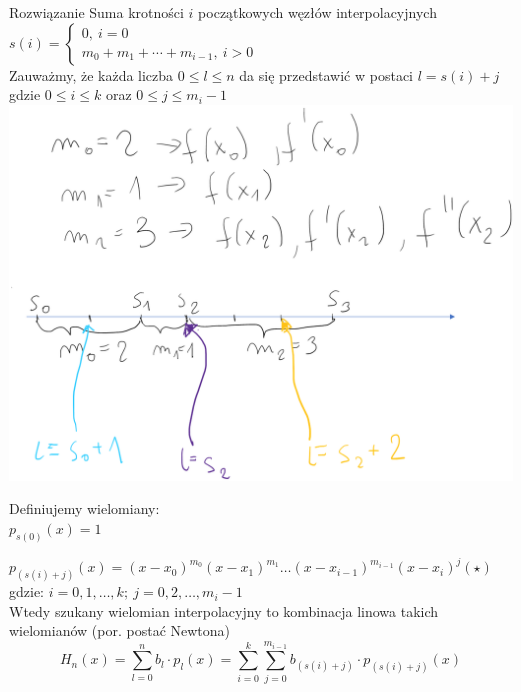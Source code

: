 \begin{frame}{Rozwiązanie}
Suma krotności $i$ początkowych węzłów interpolacyjnych
\vspace{2mm}
$s(i)=\left\{\begin{array}{l}
0,\ i=0\\
m_{0}+m_{1}+\cdots+m_{i-1},\ i>0
\end{array}\right.$
\vspace{2mm}\\

Zauważmy, że każda liczba 
$0\leq l\leq n$ da się przedstawić w postaci $l=s(i)+j$ gdzie $0 \leq i \leq k$ oraz $0 \leq j \leq m_{i}-1$\\
\includegraphics[scale=0.3]{img/3/hermit.png}
\end{frame}
\begin{frame}
\vspace{0.5cm}
Definiujemy wielomiany:\\
$p_{s(0)}(x)=1$

$p_{(s(i)+j)}(x)=(x-x_{0})^{m_{0}}(x-x_{1})^{m_{1}}\ldots(x-x_{i-1})^{m_{i-1}}(x-x_{i})^{j}(\star)$ \\
gdzie: $i=0, 1, \dots, k; \: j=0, 2, \dots , m_{i}-1$ \\
Wtedy szukany wielomian interpolacyjny to kombinacja linowa takich wielomianów (por. postać Newtona)
$$
H_{n}(x)=\sum_{l=0}^{n}b_{l}\cdot p_{l}(x)=\sum_{i=0}^{k}\sum_{j=0}^{m_{i-1}}b_{(s(i)+j)}\cdot p_{(s(i)+j)}(x)
$$
\end{frame}

